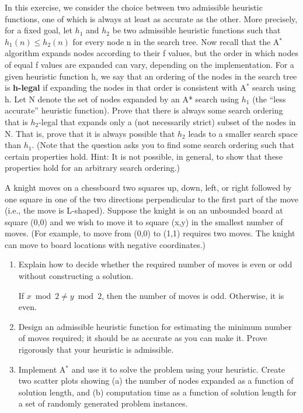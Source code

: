 \documentclass[12pt]{article}
\newenvironment{problem}[2][Problem]{\begin{trivlist}
\item[\hskip \labelsep {\bfseries #1}\hskip \labelsep {\bfseries #2.}]}{\end{trivlist}}
\begin{document}
\begin{problem}{4}
	In this exercise, we consider the choice between two admissible heuristic functions, one of which is always at least as accurate as the other.
	More precisely, for a fixed goal, let $h_1$ and $h_2$ be two admissible heuristic functions such that $h_1(n) \le h_2(n)$ for every node n in the search tree.
	Now recall that the A$^*$ algorithm expands nodes according to their f values, but the order in which nodes of equal f values are expanded can vary, depending on the implementation.
	For a given heuristic function h, we say that an ordering of the nodes in the search tree is \textbf{h-legal} if expanding the nodes in that order is consistent with A$^*$ search using h.
	Let N denote the set of nodes expanded by an A* search using $h_1$ (the ``less accurate'' heuristic function).
	Prove that there is always some search ordering that is $h_2$-legal that expands only a (not necessarily strict) subset of the nodes in N.
	That is, prove that it is always possible that $h_2$ leads to a smaller search space than $h_1$.
	(Note that the question asks you to find some search ordering such that certain properties hold.
	Hint: It is not possible, in general, to show that these properties hold for an arbitrary search ordering.)
\end{problem}
\begin{problem}{5}
	A knight moves on a chessboard two squares up, down, left, or right followed by one square in one of the two directions perpendicular to the first part of the move (i.e., the move is L-shaped).
	Suppose the knight is on an unbounded board at square (0,0) and we wish to move it to square (x,y) in the smallest number of moves.
	(For example, to move from (0,0) to (1,1) requires two moves. The knight can move to board locations with negative coordinates.) 
	\begin{enumerate}
		\item Explain how to decide whether the required number of moves is even or odd without constructing a solution.

			\vspace{0.25cm}
			If $x \bmod 2 \neq y \bmod 2$, then the number of moves is odd. Otherwise, it is even.
		\item Design an admissible heuristic function for estimating the minimum number of moves required; it should be as accurate as you can make it.
			Prove rigorously that your heuristic is admissible.
		\item Implement A$^*$ and use it to solve the problem using your heuristic.
			Create two scatter plots showing (a) the number of nodes expanded as a function of solution length, and (b) computation time as a function of solution length for a set of randomly generated problem instances. 
	\end{enumerate}
\end{problem}
\end{document}
